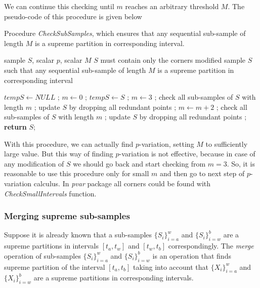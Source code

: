 \documentclass[12pt, a4paper]{article}
\numberwithin{equation}{section}
\begin{document}
We can continue this checking until $m$ 
reaches an arbitrary threshold $M$.
The  pseudo-code  of this procedure is given below

\begin{algorithm}[H]
\caption{Procedure \emph{CheckSubSamples}, which ensures 
that any sequential sub-sample of length $M$ is a supreme partition in corresponding interval.}
\label{alg:CheckSubSamples}
\begin{algorithmic}[1]
\Input sample $S$, scalar $p$, scalar $M$
\Require $S$ must contain only the corners
\Output modified sample $S$ such that any sequential sub-sample of length $M$ is a supreme partition in corresponding interval

\State $tempS \leftarrow NULL$ ;
\State $m \leftarrow 0$ ;
  \State $tempS \leftarrow S$ ;
  \State $m \leftarrow 3$ ;
  \State check all sub-samples of $S$ with length $m$ ;
  \State update $S$ by dropping all redundant points ;  
    \State $m \leftarrow m + 2$ ;
    \State check all sub-samples of $S$ with length $m$ ;
    \State update $S$ by dropping all redundant points ; 
  \EndWhile
\EndWhile
\State \textbf{return} $S$;
\EndFunction
\end{algorithmic}
\end{algorithm}


With this procedure, we can actually find 
$p$-variation, setting $M$ to sufficiently large value.
But this way of finding $p$-variation is not effective, 
because in case of any modification of $S$ 
we should go back and start checking
from $m=3$.
So, it is reasonable to use this procedure
only for small $m$ and then go
to next step of $p$-variation calculus.
In \emph{pvar} package all corners could be found with \emph{CheckSmallIntervals} function.


\subsubsection{Merging supreme sub-samples}
\label{sec:meging}

Suppose it is already known that 
a sub-samples $\{S_{i}\}_{i=a}^{w}$  
and $\{S_{i}\}_{i=w}^{b}$
are a supreme partitions in intervals 
$[t_a,t_w]$ and $[t_w,t_b]$ correspondingly. 
The \emph{merge} operation of sub-samples 
$\{S_{i}\}_{i=a}^{w}$ and $\{S_{i}\}_{i=w}^{b}$
is an operation that finds supreme partition 
of the interval $[t_a,t_b]$ taking into account
that  $\{X_{i}\}_{i=a}^{w}$  and $\{X_{i}\}_{i=w}^{b}$
are a supreme partitions in corresponding intervals.
\end{document}
